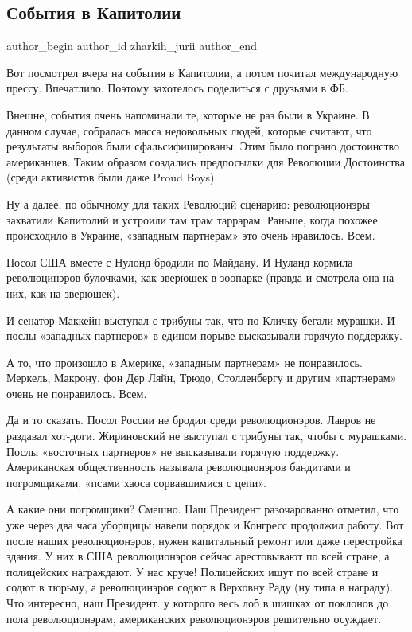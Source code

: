 
 
 
 
 
\subsection{События в Капитолии}
\ifcmt
  author_begin
   author_id zharkih_jurii
  author_end
\fi

Вот посмотрел вчера на события в Капитолии, а потом почитал международную
прессу. Впечатлило. Поэтому захотелось поделиться с друзьями в ФБ.

Внешне, события очень напоминали те, которые не раз были в Украине. В данном
случае, собралась масса недовольных людей, которые считают, что результаты
выборов были сфальсифицированы. Этим было попрано достоинство американцев.
Таким образом создались предпосылки для Революции Достоинства (среди активистов
были даже Proud Boys).

Ну а далее, по обычному для таких Революций сценарию: революционэры захватили
Капитолий и устроили там трам таррарам. Раньше, когда похожее происходило в
Украине, «западным партнерам» это очень нравилось. Всем.

Посол США вместе с Нулонд бродили по Майдану. И Нуланд кормила революцинэров
булочками, как зверюшек в зоопарке (правда и смотрела она на них, как на
зверюшек). 

И сенатор Маккейн выступал с трибуны так, что по Кличку бегали
мурашки. И послы «западных партнеров» в едином порыве высказывали горячую
поддержку.

А то, что произошло в Америке, «западным партнерам» не понравилось. Меркель,
Макрону, фон Дер Ляйн, Трюдо, Столленбергу и другим «партнерам» очень не
понравилось. Всем.

Да и то сказать. Посол России не бродил среди революционэров. Лавров не
раздавал хот-доги. Жириновский не выступал с трибуны так, чтобы с мурашками.
Послы «восточных партнеров» не высказывали горячую поддержку. Американская
общественность называла революционэров бандитами и погромщиками, «псами хаоса
сорвавшимися с цепи».

А какие они погромщики? Смешно. Наш Президент разочарованно отметил, что уже
через два часа уборщицы навели порядок и Конгресс продолжил работу. Вот после
наших революционэров, нужен капитальный ремонт или даже перестройка здания. У
них в США революционэров сейчас арестовывают по всей стране, а полицейских
награждают. У нас круче! Полицейских ищут по всей стране и содют в тюрьму, а
революцинэров содют в Верховну Раду (ну типа в награду). Что интересно, наш
Президент. у которого весь лоб в шишках от поклонов до пола революционэрам,
американских революционэров решительно осуждает.

